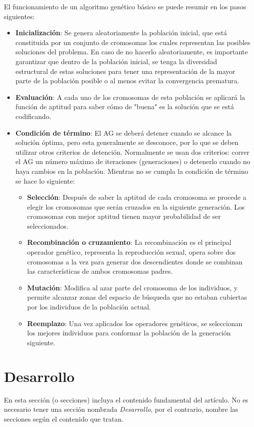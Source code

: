 \documentclass[a4paper,10pt,twocolumn]{article}
\begin{document}
El funcionamiento de un algoritmo genético básico se puede resumir en los pasos siguientes:
\begin{itemize}
	\item \textbf{Inicialización}: Se genera aleatoriamente la población inicial, que está constituida por un conjunto de cromosomas los cuales representan las posibles soluciones del problema. En caso de no hacerlo aleatoriamente, es importante garantizar que dentro de la población inicial, se tenga la diversidad estructural de estas soluciones para tener una representación de la mayor parte de la población posible o al menos evitar la convergencia prematura.
	\item \textbf{Evaluación}: A cada uno de los cromosomas de esta población se aplicará la función de aptitud para saber cómo de "buena" es la solución que se está codificando.
	\item \textbf{Condición de término}: El AG se deberá detener cuando se alcance la solución óptima, pero esta generalmente se desconoce, por lo que se deben utilizar otros criterios de detención. Normalmente se usan dos criterios: correr el AG un número máximo de iteraciones (generaciones) o detenerlo cuando no haya cambios en la población. Mientras no se cumpla la condición de término se hace lo siguiente:
	\begin{itemize}
		\item \textbf{Selección}: Después de saber la aptitud de cada cromosoma se procede a elegir los cromosomas que serán cruzados en la siguiente generación. Los cromosomas con mejor aptitud tienen mayor probabilidad de ser seleccionados.
		\item \textbf{Recombinación o cruzamiento}: La recombinación es el principal operador genético, representa la reproducción sexual, opera sobre dos cromosomas a la vez para generar dos descendientes donde se combinan las características de ambos cromosomas padres.
		\item \textbf{Mutación}: Modifica al azar parte del cromosoma de los individuos, y permite alcanzar zonas del espacio de búsqueda que no estaban cubiertas por los individuos de la población actual.
		\item \textbf{Reemplazo}: Una vez aplicados los operadores genéticos, se seleccionan los mejores individuos para conformar la población de la generación siguiente. \cite{5}
	\end{itemize}
\end{itemize}


\section{Desarrollo}\label{sec:dev}
  En esta sección (o secciones) incluya el contenido fundamental del artículo.
  No es necesario tener una sección nombrada \emph{Desarrollo}, por el contrario,
  nombre las secciones según el contenido que tratan.
\end{document}
